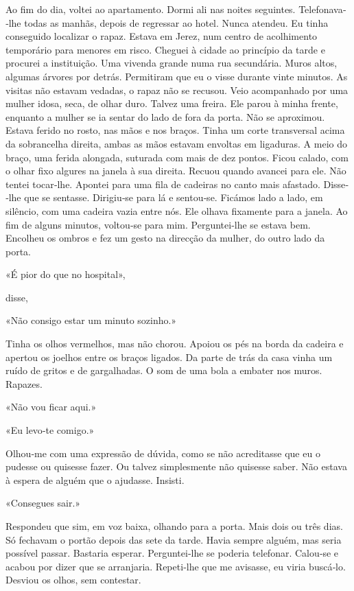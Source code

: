Ao fim do dia, voltei ao apartamento. Dormi ali nas noites seguintes.
Telefonava­‑lhe todas as manhãs, depois de regressar ao hotel. Nunca
atendeu. Eu tinha conseguido localizar o rapaz. Estava em Jerez, num
centro de acolhimento temporário para menores em risco. Cheguei à cidade
ao princípio da tarde e procurei a instituição. Uma vivenda grande numa
rua secundária. Muros altos, algumas árvores por detrás. Permitiram que
eu o visse durante vinte minutos. As visitas não estavam vedadas, o
rapaz não se recusou. Veio acompanhado por uma mulher idosa, seca, de
olhar duro. Talvez uma freira. Ele parou à minha frente, enquanto a
mulher se ia sentar do lado de fora da porta. Não se aproximou. Estava
ferido no rosto, nas mãos e nos braços. Tinha um corte transversal acima
da sobrancelha direita, ambas as mãos estavam envoltas em ligaduras. A
meio do braço, uma ferida alongada, suturada com mais de dez pontos.
Ficou calado, com o olhar fixo algures na janela à sua direita. Recuou
quando avancei para ele. Não tentei tocar­‑lhe. Apontei para uma fila de
cadeiras no canto mais afastado. Disse­‑lhe que se sentasse. Dirigiu­‑se
para lá e sentou­‑se. Ficámos lado a lado, em silêncio, com uma cadeira
vazia entre nós. Ele olhava fixamente para a janela. Ao fim de alguns
minutos, voltou­‑se para mim. Perguntei­‑lhe se estava bem. Encolheu os
ombros e fez um gesto na direcção da mulher, do outro lado da porta.

«É pior do que no hospital»,

disse,

«Não consigo estar um minuto sozinho.»

Tinha os olhos vermelhos, mas não chorou. Apoiou os pés na borda da
cadeira e apertou os joelhos entre os braços ligados. Da parte de trás
da casa vinha um ruído de gritos e de gargalhadas. O som de uma bola a
embater nos muros. Rapazes.

«Não vou ficar aqui.»

«Eu levo­‑te comigo.»

Olhou­‑me com uma expressão de dúvida, como se não acreditasse que eu o
pudesse ou quisesse fazer. Ou talvez simplesmente não quisesse saber.
Não estava à espera de alguém que o ajudasse. Insisti.

«Consegues sair.»

Respondeu que sim, em voz baixa, olhando para a porta. Mais dois ou três
dias. Só fechavam o portão depois das sete da tarde. Havia sempre
alguém, mas seria possível passar. Bastaria esperar. Perguntei­‑lhe se
poderia telefonar. Calou­‑se e acabou por dizer que se arranjaria.
Repeti­‑lhe que me avisasse, eu viria buscá­‑lo. Desviou os olhos, sem
contestar.

